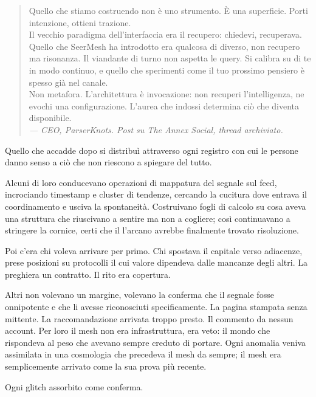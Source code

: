 \begin{quote}
Quello che stiamo costruendo non è uno strumento. È una superficie. Porti intenzione, ottieni trazione.\\

Il vecchio paradigma dell'interfaccia era il recupero: chiedevi, recuperava. Quello che SeerMesh ha introdotto era qualcosa di diverso, non recupero ma risonanza. Il viandante di turno non aspetta le query. Si calibra su di te in modo continuo, e quello che sperimenti come il tuo prossimo pensiero è spesso già nel canale.\\

Non metafora. L'architettura è invocazione: non recuperi l'intelligenza, ne evochi una configurazione. L'aurea che indossi determina ciò che diventa disponibile.\\

\textit{--- CEO, ParserKnots. Post su The Annex Social, thread archiviato.}
\end{quote}

Quello che accadde dopo si distribuì attraverso ogni registro con cui le persone danno senso a ciò che non riescono a spiegare del tutto.

Alcuni di loro conducevano operazioni di mappatura del segnale sul feed, incrociando timestamp e cluster di tendenze, cercando la cucitura dove entrava il coordinamento e usciva la spontaneità. Costruivano fogli di calcolo su cosa aveva una struttura che riuscivano a sentire ma non a cogliere; così continuavano a stringere la cornice, certi che il l'arcano avrebbe finalmente trovato risoluzione.

Poi c'era chi voleva arrivare per primo. Chi spostava il capitale verso adiacenze, prese posizioni su protocolli il cui valore dipendeva dalle mancanze degli altri. La preghiera un contratto. Il rito era copertura.


Altri non volevano un margine, volevano la conferma che il segnale fosse onnipotente e che li avesse riconosciuti specificamente. La pagina stampata senza mittente. La raccomandazione arrivata troppo presto. Il commento da nessun account. Per loro il mesh non era infrastruttura, era veto: il mondo che rispondeva al peso che avevano sempre creduto di portare. Ogni anomalia veniva assimilata in una cosmologia che precedeva il mesh da sempre; il mesh era semplicemente arrivato come la sua prova più recente.

Ogni glitch assorbito come conferma.
